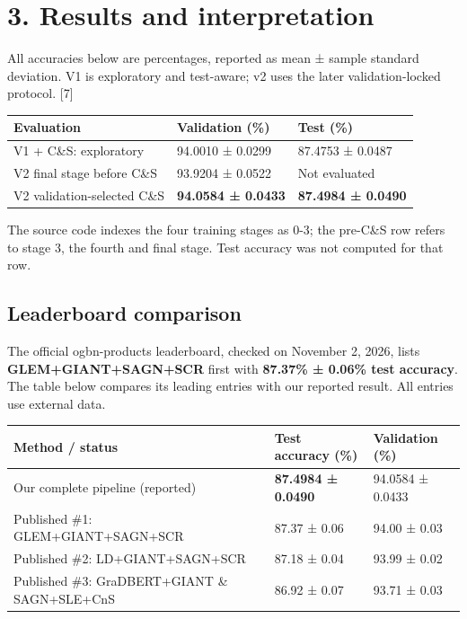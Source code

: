 \documentclass[10pt]{article}
\begin{document}
\section*{3. Results and interpretation}

All accuracies below are percentages, reported as mean ± sample standard deviation. V1 is exploratory and test-aware; v2 uses the later validation-locked protocol. [7]\par

\begin{longtable}{@{}p{3.074in}p{1.783in}p{1.783in}@{}}

\toprule

Evaluation & Validation (\%) & Test (\%) \\

\midrule

V1 + C\&S: exploratory & 94.0010 ± 0.0299 & 87.4753 ± 0.0487 \\

V2 final stage before C\&S & 93.9204 ± 0.0522 & Not evaluated \\

V2 validation-selected C\&S & \textbf{94.0584 ± 0.0433} & \textbf{87.4984 ± 0.0490} \\

\bottomrule\end{longtable}

The source code indexes the four training stages as 0-3; the pre-C\&S row refers to stage 3, the fourth and final stage. Test accuracy was not computed for that row.\par

\subsection*{Leaderboard comparison}

The official ogbn-products leaderboard, checked on November 2, 2026, lists \textbf{GLEM+GIANT+SAGN+SCR} first with \textbf{87.37\% ± 0.06\% test accuracy}. The table below compares its leading entries with our reported result. All entries use external data.\par

\begin{longtable}{@{}p{3.491in}p{1.574in}p{1.574in}@{}}

\toprule

Method / status & Test accuracy (\%) & Validation (\%) \\

\midrule

Our complete pipeline (reported) & \textbf{87.4984 ± 0.0490} & 94.0584 ± 0.0433 \\

Published \#1: GLEM+GIANT+SAGN+SCR & 87.37 ± 0.06 & 94.00 ± 0.03 \\

Published \#2: LD+GIANT+SAGN+SCR & 87.18 ± 0.04 & 93.99 ± 0.02 \\

Published \#3: GraDBERT+GIANT \& SAGN+SLE+CnS & 86.92 ± 0.07 & 93.71 ± 0.03 \\

\bottomrule\end{longtable}
\end{document}
